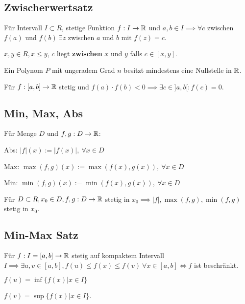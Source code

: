 \subsection{Zwischerwertsatz}
Für Intervall $I \subset R$, stetige Funktion $f: I \to \mathbb{R}$ und $a, b \in I \implies \forall c$ zwischen $f(a)$ und $f(b) \ \exists z$ zwischen $a$ und $b$ mit $f(z) = c$.
\begin{compactitem}
    \item $x, y \in R, x \le y$, $c$ liegt \textbf{zwischen} $x$ und $y$ falls $c \in [x, y]$.
    \item Ein Polynom $P$ mit ungeradem Grad $n$ besitzt mindestens eine Nullstelle in $\mathbb{R}$.
    \item Für $f: [a,b] \to \mathbb{R}$ stetig und $f(a) \cdot f(b) < 0 \implies \exists c \in ]a,b[: f(c) = 0$.
\end{compactitem}

\subsection{Min, Max, Abs}
Für Menge $D$ und $f,g: D \to \mathbb{R}$:
\begin{compactdesc}
    \item[Abs:] $|f|(x) := |f(x)|, \ \forall x \in D$
    \item[Max:] $\max(f,g)(x) := \max(f(x), g(x)), \ \forall x \in D$
    \item[Min:] $\min(f,g)(x) := \min(f(x), g(x)), \ \forall x \in D$
\end{compactdesc}
\begin{compactitem}
    \item Für $D \subset R, x_0 \in D, f,g: D \to \mathbb{R}$ stetig in $x_0 \implies |f|, \max(f,g), \min(f,g)$ stetig in $x_0$.
\end{compactitem}

\subsection{Min-Max Satz}
Für $f:I = [a, b] \to \mathbb{R}$ stetig auf kompaktem Intervall $I \implies \exists u,v \in [a,b], f(u) \le f(x) \le f(v) \ \forall x \in [a,b] \iff f$ ist beschränkt.

\begin{inparaitem}
    \item $f(u) = \inf \{f(x) | x \in I\}$
    \item $f(v) = \sup \{f(x) | x \in I\}$.
\end{inparaitem}

